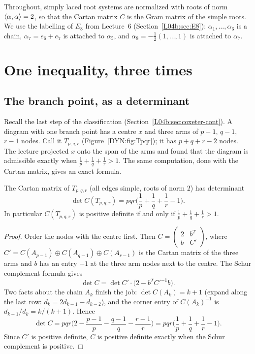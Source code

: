 Throughout, simply laced root systems are normalized with roots of norm $\langle \alpha, \alpha\rangle=2$, so that
the Cartan matrix $C$ is the Gram matrix of the simple roots. We use the labelling of $E_8$ from
Lecture~6 (Section~\ref{L04b:sec:E8}): $\alpha_1,\dots,\alpha_6$ is a chain, $\alpha_7=e_6+e_7$ is
attached to $\alpha_5$, and $\alpha_8=-\frac12(1,\dots,1)$ is attached to $\alpha_7$.

\section{One inequality, three times}
\label{DYN:sec:pqr}

\subsection*{The branch point, as a determinant}
Recall the last step of the classification (Section~\ref{L04b:sec:coxeter-cont}). A diagram with one
branch point has a centre $x$ and three arms of $p-1$, $q-1$, $r-1$ nodes. Call it $T_{p,q,r}$
(Figure~\ref{DYN:fig:Tpqr}); it has $p+q+r-2$ nodes. The lecture projected $x$ onto the span of the
arms and found that the diagram is admissible exactly when
$\frac1p+\frac1q+\frac1r>1$. The same computation, done with the Cartan matrix, gives an exact formula.

\begin{proposition}\label{DYN:prop:detT}
The Cartan matrix of $T_{p,q,r}$ (all edges simple, roots of norm $2$) has determinant
\[
  \det C(T_{p,q,r})=pqr\Big(\frac1p+\frac1q+\frac1r-1\Big).
\]
In particular $C(T_{p,q,r})$ is positive definite if and only if $\frac1p+\frac1q+\frac1r>1$.
\end{proposition}

\begin{proof}
Order the nodes with the centre first. Then
$C=\left(\begin{smallmatrix}2&b^T\\ b&C'\end{smallmatrix}\right)$, where
$C'=C(A_{p-1})\oplus C(A_{q-1})\oplus C(A_{r-1})$ is the Cartan matrix of the three arms and $b$ has an
entry $-1$ at the three arm nodes next to the centre. The Schur complement formula gives
\[
  \det C=\det C'\cdot\big(2-b^TC'^{-1}b\big).
\]
Two facts about the chain $A_k$ finish the job: $\det C(A_k)=k+1$ (expand along the last row:
$d_k=2d_{k-1}-d_{k-2}$), and the corner entry of $C(A_k)^{-1}$ is
$d_{k-1}/d_k=k/(k+1)$. Hence
\[
  \det C=pqr\Big(2-\frac{p-1}p-\frac{q-1}q-\frac{r-1}r\Big)=pqr\Big(\frac1p+\frac1q+\frac1r-1\Big).
\]
Since $C'$ is positive definite, $C$ is positive definite exactly when the Schur complement is
positive.
\end{proof}

